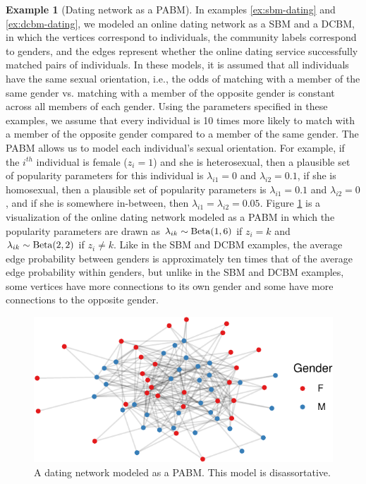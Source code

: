 \documentclass[
  12pt,
]{article}
\theoremstyle{definition}
\theoremstyle{definition}
\newtheorem{example}{Example}[section]
\theoremstyle{definition}
\theoremstyle{definition}
\theoremstyle{remark}
\begin{document}
\begin{example}[Dating network as a PABM]
\label{ex:pabm-dating}
In examples \ref{ex:sbm-dating} and \ref{ex:dcbm-dating}, we modeled an online dating network as a SBM and a DCBM, in which the vertices correspond to individuals, the community labels correspond to genders, and the edges represent whether the online dating service successfully matched pairs of individuals. 
In these models, it is assumed that all individuals have the same sexual orientation, i.e., the odds of matching with a member of the same gender vs. matching with a member of the opposite gender is constant across all members of each gender. 
Using the parameters specified in these examples, we assume that every individual is 10 times more likely to match with a member of the opposite gender compared to a member of the same gender. 
The PABM allows us to model each individual's sexual orientation. 
For example, if the $i^{th}$ individual is female ($z_i = 1$) and she is heterosexual, then a plausible set of popularity parameters for this individual is $\lambda_{i1} = 0$ and $\lambda_{i2} = 0.1$,
if she is homosexual, then a plausible set of popularity parameters is $\lambda_{i1} = 0.1$ and $\lambda_{i2} = 0$, 
and if she is somewhere in-between, then $\lambda_{i1} = \lambda_{i2} = 0.05$. 
Figure \ref{fig:dating-pabm} is a visualization of the online dating network modeled as a PABM in which the popularity parameters are drawn as $\lambda_{ik} \sim \mathrm{Beta}(1, 6)$ if $z_i = k$ and $\lambda_{ik} \sim \mathrm{Beta}(2, 2)$ if $z_i \neq k$. 
Like in the SBM and DCBM examples, the average edge probability between genders is approximately ten times that of the average edge probability within genders, but unlike in the SBM and DCBM examples, some vertices have more connections to its own gender and some have more connections to the opposite gender. 

\begin{figure}[H]

{\centering \includegraphics{draft_files/figure-latex/dating-pabm-1} 

}

\caption{A dating network modeled as a PABM. This model is disassortative.}\label{fig:dating-pabm}
\end{figure}
\end{example}
\end{document}
